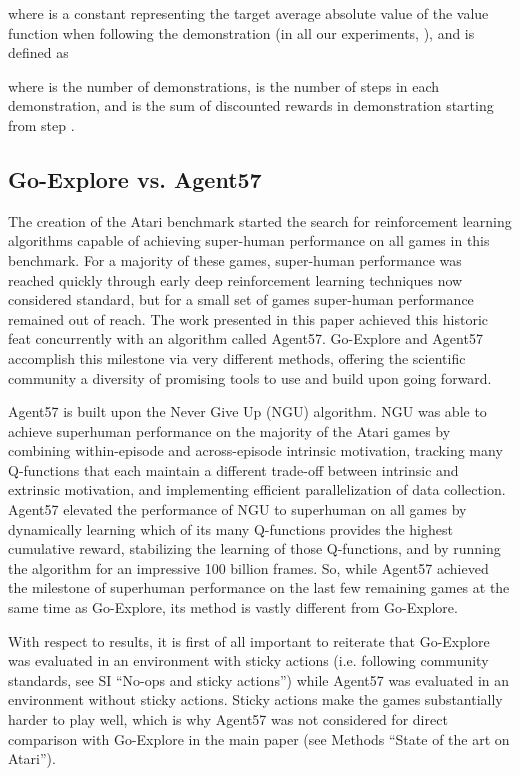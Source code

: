 \documentclass{nature}
\renewcommand*{\cite}[1]{\supercite{#1}}
\begin{document}
where  is a constant representing the target average absolute value of the value function when following the demonstration (in all our experiments, ), and  is defined as

where  is the number of demonstrations,  is the number of steps in each demonstration, and  is the sum of discounted rewards in demonstration  starting from step .

\subsection{Go-Explore vs. Agent57}

The creation of the Atari benchmark started the search for reinforcement learning algorithms capable of achieving super-human performance on all games in this benchmark\cite{bellemare2013arcade}.
For a majority of these games, super-human performance was reached quickly through early deep reinforcement learning techniques now considered standard\cite{mnih:nature15}, but for a small set of games super-human performance remained out of reach.
The work presented in this paper achieved this historic feat concurrently with an algorithm called Agent57\cite{badia2020agent57}.
Go-Explore and Agent57 accomplish this milestone via very different methods, offering the scientific community a diversity of promising tools to use and build upon going forward.

Agent57 is built upon the Never Give Up (NGU) algorithm\cite{puigdomenech2020never}.
NGU was able to achieve superhuman performance on the majority of the Atari games by combining within-episode and across-episode intrinsic motivation, tracking many Q-functions that each maintain a different trade-off between intrinsic and extrinsic motivation, and implementing efficient parallelization of data collection. 
Agent57 elevated the performance of NGU to superhuman on all games by dynamically learning which of its many Q-functions provides the highest cumulative reward, stabilizing the learning of those Q-functions, and by running the algorithm for an impressive 100 billion frames.
So, while Agent57 achieved the milestone of superhuman performance on the last few remaining games at the same time as Go-Explore, its method is vastly different from Go-Explore.


With respect to results, it is first of all important to reiterate that Go-Explore was evaluated in an environment with sticky actions (i.e. following community standards, see SI ``No-ops and sticky actions'') while Agent57 was evaluated in an environment without sticky actions.
Sticky actions make the games substantially harder to play well, which is why Agent57 was not considered for direct comparison with Go-Explore in the main paper (see Methods ``State of the art on Atari'').
\end{document}
